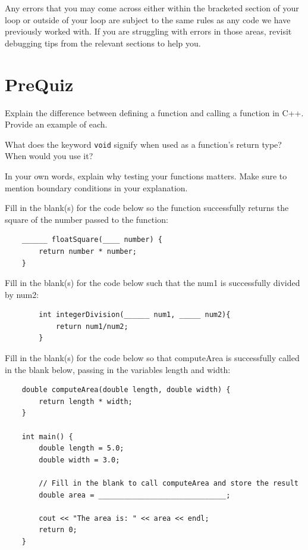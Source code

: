 Any errors that you may come across either within the bracketed section of your loop or outside of your loop are subject to the same rules as any code we have previously worked with. If you are struggling with errors in those areas, revisit debugging tips from the relevant sections to help you. 

\section{PreQuiz}
\begin{problem} Explain the difference between defining a function and calling a function in C++. Provide an example of each.
\end{problem}

\begin{problem} What does the keyword \texttt{void} signify when used as a function's return type? When would you use it?
\end{problem}

\begin{problem}
In your own words, explain why testing your functions matters. Make sure to mention boundary conditions in your explanation.
\end{problem}

\vspace{5cm}

\begin{problem}
    Fill in the blank(s) for the code below so the function successfully returns the square of the number passed to the function:
    \begin{verbatim}
    ______ floatSquare(____ number) {
        return number * number;
    }
\end{verbatim}

\end{problem}

\begin{problem}
    Fill in the blank(s) for the code below such that the num1 is successfully divided by num2:
    \begin{verbatim}
        int integerDivision(______ num1, _____ num2){
            return num1/num2;
        }
    \end{verbatim}
\end{problem}

\begin{problem}
    Fill in the blank(s) for the code below so that computeArea is successfully called in the blank below, passing in the variables length and width:
    \begin{verbatim}
    double computeArea(double length, double width) {
        return length * width;
    }
    
    int main() {
        double length = 5.0;
        double width = 3.0;
    
        // Fill in the blank to call computeArea and store the result
        double area = ______________________________;
    
        cout << "The area is: " << area << endl;
        return 0;
    }
    \end{verbatim}

\end{problem}

